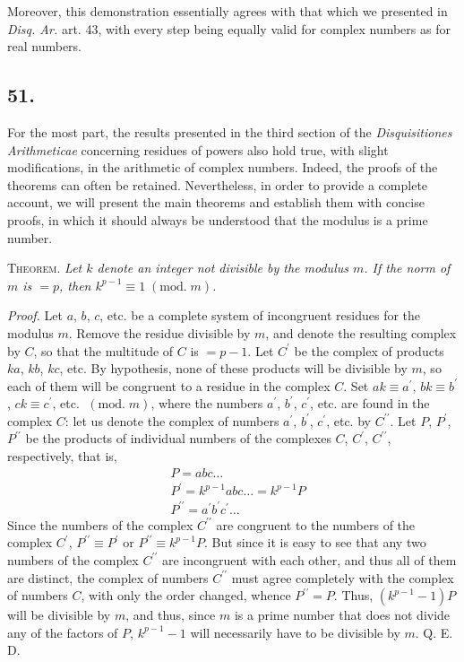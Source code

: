 \documentclass[twoside,12pt]{memoir}
\renewcommand{\pmod}[1]{\;(\textrm{mod.}\;#1)}
\begin{document}
Moreover, this demonstration essentially agrees with that which we presented in \textit{Disq. Ar.} art. 43, with every step being equally valid for complex numbers as for real numbers.\pagebreak%

\subsection*{51.}

For the most part, the results presented in the third section of the \textit{Disquisitiones Arithmeticae} concerning residues of powers also hold true, with slight modifications, in the arithmetic of complex numbers. Indeed, the proofs of the theorems can often be retained. Nevertheless, in order to provide a complete account, we will present the main theorems and establish them with concise proofs, in which it should always be understood that the modulus is a prime number.

\textsc{Theorem.} \textit{Let \(k\) denote an integer not divisible by the modulus \(m\).  If the norm of \(m\) is \(=p\), then \(k^{p-1} \equiv 1 \pmod{m}\).}
 
\textit{Proof.} Let \(a\), \(b\), \(c\), etc{.} be a complete system of incongruent residues for the modulus \(m\).  Remove the residue divisible by \(m\), and denote the resulting complex by \(C\), so that the multitude of \(C\) is \(=p-1\).  Let \(C^{\prime}\) be the complex of products \(k a\), \(k b\), \(k c\), etc.  By hypothesis, none of these products will be divisible by \(m\), so each of them will be congruent to a residue in the complex \(C\).  Set \(a k \equiv a^{\prime}\), \(b k \equiv b^{\prime}\), \(c k \equiv c^{\prime}\), etc{.} \(\pmod{m}\), where the numbers \(a^{\prime}\), \(b^{\prime}\), \(c^{\prime}\), etc{.} are found in the complex \(C\): let us denote the complex of numbers \(a^{\prime}\), \(b^{\prime}\), \(c^{\prime}\), etc{.} by \(C^{\prime \prime}\). Let \(P\), \(P^{\prime}\), \(P^{\prime \prime}\) be the products of individual numbers of the complexes \(C\), \(C^{\prime}\), \(C^{\prime \prime}\), respectively, that is,
\[\begin{aligned}
& P=a b c \ldots \\
& P^{\prime}=k^{p-1} a b c \ldots=k^{p-1} P \\
& P^{\prime \prime}=a^{\prime} b^{\prime} c^{\prime} \ldots
\end{aligned}\]
Since the numbers of the complex \(C^{\prime \prime}\) are congruent to the numbers of the complex \(C^{\prime}\), \(P^{\prime \prime} \equiv P^{\prime}\) or \(P^{\prime \prime} \equiv k^{p-1} P\). But since it is easy to see that any two numbers of the complex \(C^{\prime \prime}\) are incongruent with each other, and thus all of them are distinct, the complex of numbers \(C^{\prime \prime}\) must agree completely with the complex of numbers \(C\), with only the order changed, whence \(P^{\prime \prime}=P\). Thus, \((k^{p-1}-1) P\) will be divisible by \(m\), and thus, since \(m\) is a prime number that does not divide any of the factors of \(P\), \(k^{p-1}-1\) will necessarily have to be divisible by \(m\). Q. E. D.
\end{document}
